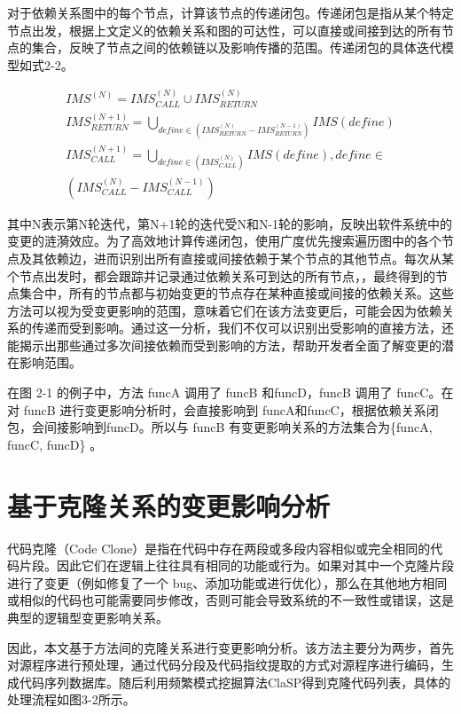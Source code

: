 对于依赖关系图中的每个节点，计算该节点的传递闭包。传递闭包是指从某个特定节点出发，根据上文定义的依赖关系和图的可达性，可以直接或间接到达的所有节点的集合，反映了节点之间的依赖链以及影响传播的范围。传递闭包的具体迭代模型如式2-2。

\begin{equation}
\begin{array}{l}
I M S^{(N)}=I M S_{C A L L}^{(N)} \cup I M S_{R E T U R N}^{(N)} \\
I M S_{ {RETURN }}^{(N+1)}=\bigcup_{define \in (I M S_{R E T U R N}^{(N)}-I M S_{R E T U R N}^{(N-1)} ) } I M S({ define }) \\
I M S_{C A L L}^{(N+1)}=\bigcup_{ {define } \in (I M S_{C A L L}^{(N)})} I M S( { define }){, define } \in \\
\left(I M S_{C A L L}^{(N)}-I M S_{C A L L}^{(N-1)}\right) 
\end{array}
\end{equation}


其中N表示第N轮迭代，第N+1轮的迭代受N和N-1轮的影响，反映出软件系统中的变更的涟漪效应。为了高效地计算传递闭包，使用广度优先搜索遍历图中的各个节点及其依赖边，进而识别出所有直接或间接依赖于某个节点的其他节点。每次从某个节点出发时，都会跟踪并记录通过依赖关系可到达的所有节点，，最终得到的节点集合中，所有的节点都与初始变更的节点存在某种直接或间接的依赖关系。这些方法可以视为受变更影响的范围，意味着它们在该方法变更后，可能会因为依赖关系的传递而受到影响。通过这一分析，我们不仅可以识别出受影响的直接方法，还能揭示出那些通过多次间接依赖而受到影响的方法，帮助开发者全面了解变更的潜在影响范围。


在图 2-1 的例子中，方法 funcA 调用了 funcB 和funcD，funcB 调用了 funcC。在对 funcB 进行变更影响分析时，会直接影响到 funcA和funcC，根据依赖关系闭包，会间接影响到funcD。所以与 funcB 有变更影响关系的方法集合为\{funcA, funcC, funcD\} 。


\section{基于克隆关系的变更影响分析}
代码克隆（Code Clone）是指在代码中存在两段或多段内容相似或完全相同的代码片段。因此它们在逻辑上往往具有相同的功能或行为。如果对其中一个克隆片段进行了变更（例如修复了一个 bug、添加功能或进行优化），那么在其他地方相同或相似的代码也可能需要同步修改，否则可能会导致系统的不一致性或错误，这是典型的逻辑型变更影响关系。

因此，本文基于方法间的克隆关系进行变更影响分析。该方法主要分为两步，首先对源程序进行预处理，通过代码分段及代码指纹提取的方式对源程序进行编码，生成代码序列数据库。随后利用频繁模式挖掘算法ClaSP得到克隆代码列表，具体的处理流程如图3-2所示。

